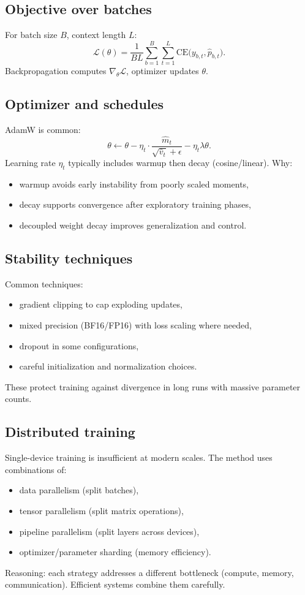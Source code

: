 \documentclass[12pt]{article}
\begin{document}
\subsection{Objective over batches}

For batch size \(B\), context length \(L\):
\[
\mathcal{L}(\theta)=\frac{1}{BL}\sum_{b=1}^{B}\sum_{t=1}^{L}\text{CE}\big(y_{b,t}, \hat{p}_{b,t}\big).
\]
Backpropagation computes \(\nabla_\theta \mathcal{L}\), optimizer updates \(\theta\).

\subsection{Optimizer and schedules}

AdamW is common:
\[
\theta \leftarrow \theta - \eta_t \cdot \frac{\hat{m}_t}{\sqrt{\hat{v}_t}+\epsilon} - \eta_t\lambda\theta.
\]
Learning rate \(\eta_t\) typically includes warmup then decay (cosine/linear). Why:
\begin{itemize}
    \item warmup avoids early instability from poorly scaled moments,
    \item decay supports convergence after exploratory training phases,
    \item decoupled weight decay improves generalization and control.
\end{itemize}

\subsection{Stability techniques}

Common techniques:
\begin{itemize}
    \item gradient clipping to cap exploding updates,
    \item mixed precision (BF16/FP16) with loss scaling where needed,
    \item dropout in some configurations,
    \item careful initialization and normalization choices.
\end{itemize}
These protect training against divergence in long runs with massive parameter counts.

\subsection{Distributed training}

Single-device training is insufficient at modern scales. The method uses combinations of:
\begin{itemize}
    \item data parallelism (split batches),
    \item tensor parallelism (split matrix operations),
    \item pipeline parallelism (split layers across devices),
    \item optimizer/parameter sharding (memory efficiency).
\end{itemize}
Reasoning: each strategy addresses a different bottleneck (compute, memory, communication). Efficient systems combine them carefully.
\end{document}
